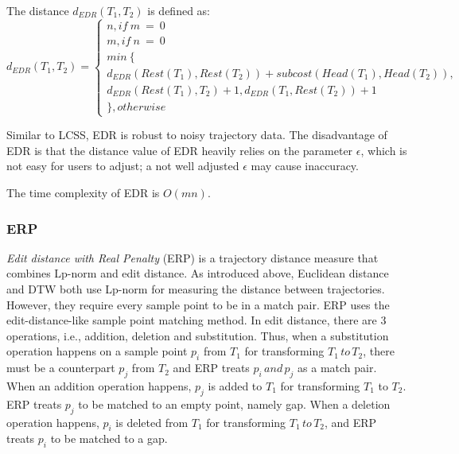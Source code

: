 \documentclass[a4paper, 12pt]{article}
\newcommand{\myequations}[1]{
   \addcontentsline{equ}{myequations}{\protect\numberline{\theequation}#1}
}
\begin{document}
The distance $d_{EDR}(T_{1},T_{2})$ is defined as:
\begin{equation} \label{eq4}
    d_{EDR}(T_{1}, T_{2}) = \begin{cases}
                                n, if \:m\:=\:0 \\
                                m, if \:n\:=\:0 \\
                                min\:\{ \\ 
                                d_{EDR}(Rest(T_{1}),Rest(T_{2})) + subcost(Head(T_{1}), Head(T_{2})), \\
                                d_{EDR}(Rest(T_{1}), T_{2}) + 1, d_{EDR}(T_{1}, Rest(T_{2})) + 1 \\
                                \}, otherwise
                            \end{cases}
\end{equation}
\myequations{EDR distance}
Similar to LCSS, EDR is robust to noisy trajectory data. The disadvantage of EDR is that the distance value of EDR heavily relies on the parameter $\epsilon$, which is not easy for users to adjust; a not well adjusted $\epsilon$ may cause inaccuracy. 

The time complexity of EDR is $O(mn)$.

\subsubsection{ERP}
\textit{Edit distance with Real Penalty} (ERP) is a trajectory distance measure that combines Lp-norm and edit distance. As introduced above, Euclidean distance and DTW both use Lp-norm for measuring the distance between trajectories. However, they require every sample point to be in a match pair. ERP uses the edit-distance-like sample point matching method. In edit distance, there are 3 operations, i.e., addition, deletion and substitution. Thus, when a substitution operation happens on a sample point $p_{i}$ from $T_{1}$ for transforming $T_{1}\,to\,T_{2}$, there must be a counterpart $p_{j}$ from $T_{2}$ and ERP treats $p_{i}\,and\,p_{j}$ as a match pair. When an addition operation happens, $p_{j}$ is added to $T_{1}$ for transforming $T_{1}$ to $T_{2}$. ERP treats $p_{j}$ to be matched to an empty point, namely gap. When a deletion operation happens, $p_{i}$ is deleted from $T_{1}$ for transforming $T_{1}\,to\,T_{2}$, and ERP treats $p_{i}$ to be matched to a gap. 
\end{document}
